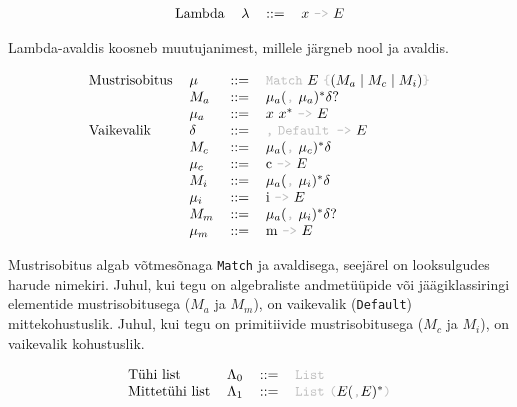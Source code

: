 \documentclass[12pt]{article}
\begin{document}
    \begin{equation*}
      \begin{tabular}{llll}
        Lambda & $\lambda$ & $::=$ & $x$ {\color{helehall}\verb!->!} $E$
      \end{tabular}
    \end{equation*}

    Lambda-avaldis koosneb muutujanimest, millele järgneb nool ja avaldis.

    \begin{equation*}
      \begin{tabular}{llll}
        Mustrisobitus & $\mu$    & $::=$ & {\color{helehall}\verb!Match!} $E$ {\color{helehall}\verb!{!}$(M_a\mid M_c\mid M_i)${\color{helehall}\verb!}!} \\
                      & $M_a$    & $::=$ & $\mu_a(${\color{helehall}\verb!,!} $\mu_a)^*\delta?$ \\
                      & $\mu_a$  & $::=$ & $x$ $x^*$ {\color{helehall}\verb!->!} $E$ \\
        Vaikevalik    & $\delta$ & $::=$ & {\color{helehall}\verb!,!} {\color{helehall}\verb!Default ->!} $E$ \\
                      & $M_c$    & $::=$ & $\mu_a(${\color{helehall}\verb!,!} $\mu_c)^*\delta$ \\
                      & $\mu_c$  & $::=$ & c {\color{helehall}\verb!->!} $E$ \\
                      & $M_i$    & $::=$ & $\mu_a(${\color{helehall}\verb!,!} $\mu_i)^*\delta$ \\
                      & $\mu_i$  & $::=$ & i {\color{helehall}\verb!->!} $E$ \\
                      & $M_m$    & $::=$ & $\mu_a(${\color{helehall}\verb!,!} $\mu_i)^*\delta?$ \\
                      & $\mu_m$  & $::=$ & m {\color{helehall}\verb!->!} $E$
      \end{tabular}
    \end{equation*}

    Mustrisobitus algab võtmesõnaga \verb!Match! ja avaldisega, seejärel on looksulgudes harude nimekiri. Juhul, kui tegu on algebraliste andmetüüpide või jäägiklassiringi elementide mustrisobitusega ($M_a$ ja $M_m$), on vaikevalik (\verb!Default!) mittekohustuslik. Juhul, kui tegu on primitiivide mustrisobitusega ($M_c$ ja $M_i$), on vaikevalik kohustuslik.

    \begin{equation*}
      \begin{tabular}{llll}
        Tühi list      & $\Lambda_0$ & $::=$ & {\color{helehall}\verb!List!} \\
        Mittetühi list & $\Lambda_1$ & $::=$ & {\color{helehall}\verb!List!} {\color{helehall}\verb!(!}$E(${\color{helehall}\verb!,!}$E)^*${\color{helehall}\verb!)!}
      \end{tabular}
    \end{equation*}
\end{document}
